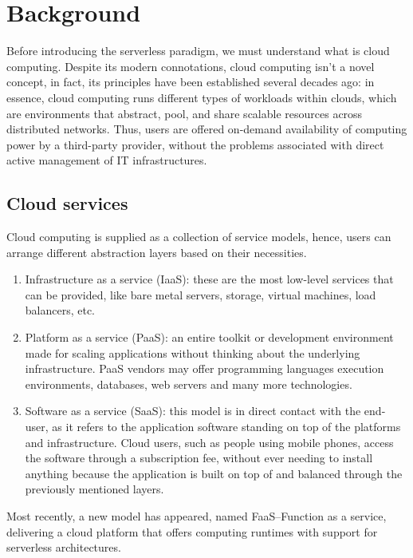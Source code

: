 \chapter{Background}
\label{chap:background}

Before introducing the serverless paradigm,
we must understand what is cloud computing\cite{nist}.
Despite its modern connotations, cloud computing
isn't a novel concept, in fact, its principles have been established
several decades ago: in essence, cloud computing
runs different types of workloads within clouds, which are environments that abstract, pool,
and share scalable resources across distributed networks.
Thus, users are offered on-demand availability of computing power by a third-party provider,
without the problems associated with direct active management of IT infrastructures.

\section{Cloud services}

Cloud computing is supplied as a collection of service models,
hence, users can arrange different abstraction layers based on their necessities.

\begin{enumerate}
  \item Infrastructure as a service (IaaS): these are the most low-level services that can be provided,
    like bare metal servers, storage, virtual machines, load balancers, etc.
  \item Platform as a service (PaaS): an entire toolkit or development environment
    made for scaling applications without thinking about the underlying infrastructure.
    PaaS vendors may offer programming languages execution environments, databases,
    web servers and many more technologies.
  \item Software as a service (SaaS): this model is in direct contact with the end-user,
    as it refers to the application software standing on top of the platforms and infrastructure.
    Cloud users, such as people using mobile phones, access the software through a subscription fee,
    without ever needing to install anything because the application is built on top of and balanced through
    the previously mentioned layers.
\end{enumerate}

Most recently, a new model has appeared, named FaaS--Function as a service,
delivering a cloud platform that offers computing runtimes with support for serverless architectures.


